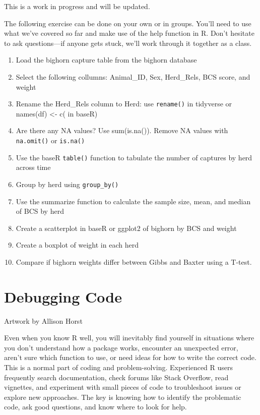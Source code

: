 \documentclass[
]{book}
\providecommand{\tightlist}{%
  \setlength{\itemsep}{0pt}\setlength{\parskip}{0pt}}
\begin{document}
This is a work in progress and will be updated.

The following exercise can be done on your own or in groups. You'll need to use what we've covered so far and make use of the help function in R. Don't hesitate to ask questions---if anyone gets stuck, we'll work through it together as a class.

\begin{enumerate}
\def\labelenumi{\arabic{enumi}.}
\tightlist
\item
  Load the bighorn capture table from the bighorn database
\item
  Select the following collumns: Animal\_ID, Sex, Herd\_Rels, BCS score, and weight
\item
  Rename the Herd\_Rels column to Herd: use \texttt{rename()} in tidyverse or names(df) \textless- c( in baseR)
\item
  Are there any NA values? Use sum(is.na()). Remove NA values with \texttt{na.omit()} or \texttt{is.na()}
\item
  Use the baseR \texttt{table()} function to tabulate the number of captures by herd across time
\item
  Group by herd using \texttt{group\_by()}
\item
  Use the summarize function to calculate the sample size, mean, and median of BCS by herd
\item
  Create a scatterplot in baseR or ggplot2 of bighorn by BCS and weight
\item
  Create a boxplot of weight in each herd
\item
  Compare if bighorn weights differ between Gibbs and Baxter using a T-test.
\end{enumerate}

\chapter{Debugging Code}\label{debugging}

Artwork by Allison Horst

Even when you know R well, you will inevitably find yourself in situations where you don't understand how a package works, encounter an unexpected error, aren't sure which function to use, or need ideas for how to write the correct code. This is a normal part of coding and problem-solving. Experienced R users frequently search documentation, check forums like Stack Overflow, read vignettes, and experiment with small pieces of code to troubleshoot issues or explore new approaches. The key is knowing how to identify the problematic code, ask good questions, and know where to look for help.
\end{document}
